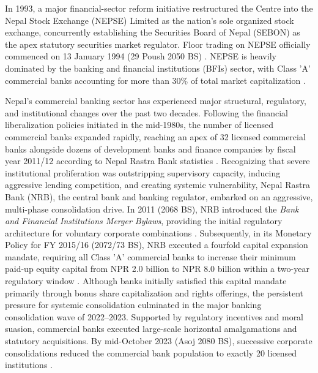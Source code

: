 In 1993, a major financial-sector reform initiative restructured the Centre into the Nepal Stock Exchange (NEPSE) Limited as the nation's sole organized stock exchange, concurrently establishing the Securities Board of Nepal (SEBON) as the apex statutory securities market regulator. Floor trading on NEPSE officially commenced on 13 January 1994 (29 Poush 2050 BS) \citep{nepse2017}. NEPSE is heavily dominated by the banking and financial institutions (BFIs) sector, with Class 'A' commercial banks accounting for more than 30\% of total market capitalization \citep{gurungdahal2025}.

Nepal's commercial banking sector has experienced major structural, regulatory, and institutional changes over the past two decades. Following the financial liberalization policies initiated in the mid-1980s, the number of licensed commercial banks expanded rapidly, reaching an apex of 32 licensed commercial banks alongside dozens of development banks and finance companies by fiscal year 2011/12 according to Nepal Rastra Bank statistics \citep{nrb2013stats}. Recognizing that severe institutional proliferation was outstripping supervisory capacity, inducing aggressive lending competition, and creating systemic vulnerability, Nepal Rastra Bank (NRB), the central bank and banking regulator, embarked on an aggressive, multi-phase consolidation drive. In 2011 (2068 BS), NRB introduced the \textit{Bank and Financial Institutions Merger Bylaws}, providing the initial regulatory architecture for voluntary corporate combinations \citep{nrb2011}. Subsequently, in its Monetary Policy for FY 2015/16 (2072/73 BS), NRB executed a fourfold capital expansion mandate, requiring all Class 'A' commercial banks to increase their minimum paid-up equity capital from NPR 2.0 billion to NPR 8.0 billion within a two-year regulatory window \citep{nrb2015}. Although banks initially satisfied this capital mandate primarily through bonus share capitalization and rights offerings, the persistent pressure for systemic consolidation culminated in the major banking consolidation wave of 2022--2023. Supported by regulatory incentives and moral suasion, commercial banks executed large-scale horizontal amalgamations and statutory acquisitions. By mid-October 2023 (Asoj 2080 BS), successive corporate consolidations reduced the commercial bank population to exactly 20 licensed institutions \citep{nrb2023list}.

